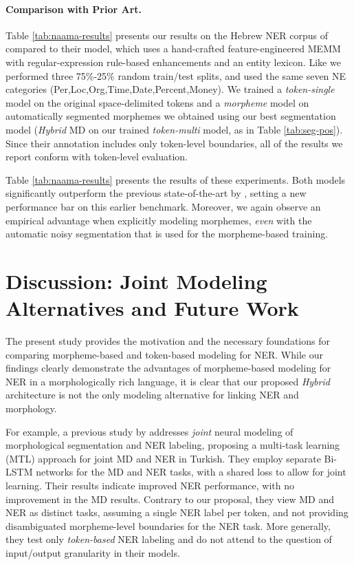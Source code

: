 \documentclass[11pt,a4paper]{article}
\newcommand{\TOKMACRO}{{\em token-single}\xspace}
\newcommand{\MULMACRO}{{\em token-multi}\xspace}
\newcommand{\MORMACRO}{{\em morpheme}\xspace}
\newcommand{\FLIPMACRO}{{\em Hybrid}\xspace}
\begin{document}
\paragraph{Comparison with Prior Art.} 
Table \ref{tab:naama-results} presents our results on the Hebrew NER corpus of \citet{naama} compared to their model, which uses a hand-crafted feature-engineered MEMM  with 
regular-expression rule-based enhancements and an entity lexicon. 
Like \citet{naama} we performed three 75\%-25\% random train/test splits,
and used the same seven NE categories {\sc (Per,Loc,Org,Time,Date,Percent,Money)}.
We trained a \TOKMACRO model on the original space-delimited tokens and a \MORMACRO model on automatically segmented morphemes we obtained using our best segmentation model (\FLIPMACRO MD on our trained \MULMACRO model, as in Table \ref{tab:seg-pos}). Since their annotation includes only token-level boundaries, all of the results we report conform with token-level evaluation.     

Table \ref{tab:naama-results} presents the results of these experiments. Both  models significantly outperform the previous state-of-the-art by \citet{naama}, setting a new performance bar on this earlier benchmark. Moreover, we again observe an empirical advantage when explicitly modeling morphemes, {\em even} with the automatic noisy segmentation that is used for the morpheme-based training. 


\section{Discussion: Joint Modeling Alternatives and Future Work} 
The present study provides the motivation and the necessary foundations  for comparing morpheme-based and token-based modeling for NER. 
While our findings  clearly demonstrate the advantages of morpheme-based modeling for NER in a morphologically rich language, it is clear  that our proposed {\em Hybrid} architecture is not the only modeling alternative for linking NER and morphology. 

For example, a previous study by \citet{DBLP:gungor-joint-md-ner} addresses {\em joint} neural modeling of morphological segmentation and NER labeling,   proposing a multi-task learning (MTL) approach for joint MD and NER in Turkish. They employ separate Bi-LSTM networks for the MD and NER tasks, with a shared loss to allow for joint learning. Their results indicate improved NER performance, with no improvement in the MD results. 
Contrary to our proposal, they view MD and NER as distinct tasks,  assuming a single NER label per token, and not providing disambiguated morpheme-level boundaries for the NER task. More generally, they test only {\em token-based} NER labeling   and do not attend to the question of input/output  granularity in their models. 
\end{document}
